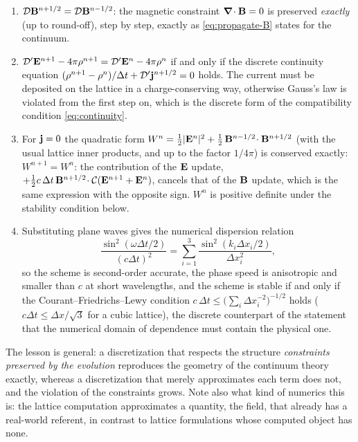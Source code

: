 \begin{enumerate}
\item $\mathcal D\mathbf{B}^{n+1/2}=\mathcal D\mathbf{B}^{n-1/2}$: the magnetic constraint
  $\boldsymbol{\nabla}\!\cdot\mathbf{B}=0$ is preserved \emph{exactly} (up to round-off), step by step,
  exactly as \eqref{eq:propagate-B} states for the continuum.
\item $\mathcal D'\mathbf{E}^{n+1}-4\pi\rho^{n+1}=\mathcal D'\mathbf{E}^n-4\pi\rho^n$ if
  and only if the discrete continuity equation
  $(\rho^{n+1}-\rho^n)/\Delta t+\mathcal D'\mathbf{j}^{n+1/2}=0$ holds.  The current must be
  deposited on the lattice in a charge-conserving way, otherwise
  Gauss's law is violated from the first step on, which is the discrete
  form of the compatibility condition \eqref{eq:continuity}.
\item For $\mathbf{j}=0$ the quadratic form
  $W^n=\tfrac12|\mathbf{E}^n|^2+\tfrac12\,\mathbf{B}^{n-1/2}\!\cdot\mathbf{B}^{n+1/2}$ (with the usual lattice
  inner products, and up to the factor $1/4\pi$) is conserved exactly:
  $W^{n+1}=W^n$: the contribution of the $\mathbf{E}$ update,
  $+\tfrac12c\,\Delta t\,\mathbf{B}^{n+1/2}\!\cdot\mathcal C(\mathbf{E}^{n+1}+\mathbf{E}^n)$, cancels that of the
  $\mathbf{B}$ update, which is the same expression with the opposite sign.
  $W^n$ is positive definite under the stability condition below.
\item Substituting plane waves gives the numerical dispersion relation
  \begin{equation}
  \frac{\sin^2(\omega\Delta t/2)}{(c\Delta t)^2}=\sum_{i=1}^3\frac{\sin^2(k_i\Delta x_i/2)}{\Delta x_i^2},
  \end{equation}
  so the scheme is second-order accurate, the phase speed is anisotropic and
  smaller than $c$ at short wavelengths, and the scheme is stable if and only if
  the Courant--Friedrichs--Lewy condition
  $c\,\Delta t\le\big(\sum_i\Delta x_i^{-2}\big)^{-1/2}$ holds ($c\Delta t\le\Delta x/\sqrt3$
  for a cubic lattice), the discrete counterpart of the statement that the
  numerical domain of dependence must contain the physical one.
\end{enumerate}
The lesson is general: a discretization that respects the structure
\emph{constraints preserved by the evolution} reproduces the geometry of the
continuum theory exactly, whereas a discretization that merely approximates
each term does not, and the violation of the constraints grows.  Note also what kind of numerics this is: the lattice computation
approximates a quantity, the field, that already has a real-world
referent, in contrast to lattice formulations whose computed object has
none.

